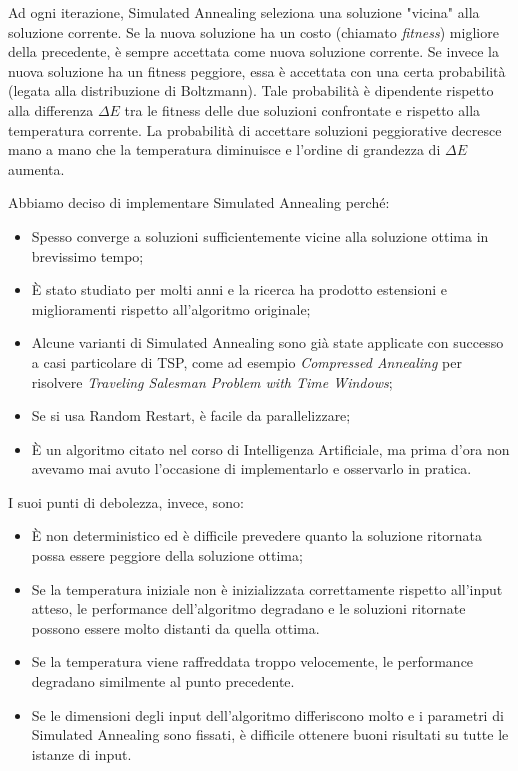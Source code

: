 \noindent Ad ogni iterazione, Simulated Annealing seleziona una soluzione "vicina" alla soluzione corrente. Se la nuova soluzione ha un costo (chiamato \textit{fitness}) migliore della precedente, è sempre accettata come nuova soluzione corrente. Se invece la nuova soluzione ha un fitness peggiore, essa è accettata con una certa probabilità (legata alla distribuzione di Boltzmann). Tale probabilità è dipendente rispetto alla differenza $\Delta E$ tra le fitness delle due soluzioni confrontate e rispetto alla temperatura corrente. La probabilità di accettare soluzioni peggiorative decresce mano a mano che la temperatura diminuisce e l'ordine di grandezza di $\Delta E$ aumenta.

\noindent Abbiamo deciso di implementare Simulated Annealing perché:

\begin{itemize}
    \item Spesso converge a soluzioni sufficientemente vicine alla soluzione ottima in brevissimo tempo;
    \item È stato studiato per molti anni e la ricerca ha prodotto estensioni e miglioramenti rispetto all'algoritmo originale;
    \item Alcune varianti di Simulated Annealing sono già state applicate con successo a casi particolare di TSP, come ad esempio \textit{Compressed Annealing} per risolvere \textit{Traveling Salesman Problem with Time Windows};
    \item Se si usa Random Restart, è facile da parallelizzare;
    \item È un algoritmo citato nel corso di Intelligenza Artificiale, ma prima d'ora non avevamo mai avuto l'occasione di implementarlo e osservarlo in pratica.
\end{itemize}

\noindent I suoi punti di debolezza, invece, sono:

\begin{itemize}
    \item È non deterministico ed è difficile prevedere quanto la soluzione ritornata possa essere peggiore della soluzione ottima;
    \item Se la temperatura iniziale non è inizializzata correttamente rispetto all'input atteso, le performance dell'algoritmo degradano e le soluzioni ritornate possono essere molto distanti da quella ottima.
    \item Se la temperatura viene raffreddata troppo velocemente, le performance degradano similmente al punto precedente.
    \item Se le dimensioni degli input dell'algoritmo differiscono molto e i parametri di Simulated Annealing sono fissati, è difficile ottenere buoni risultati su tutte le istanze di input.
\end{itemize}

